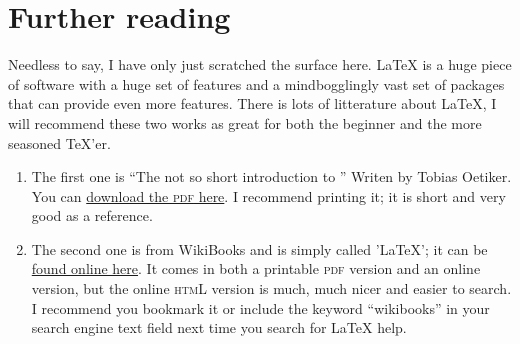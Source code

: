 \documentclass[a4paper, 11pt]{article} %
\begin{document}
\section{Further reading}
Needless to say, I have only just scratched the surface here. \LaTeX{} is a huge
piece of software with a huge set of features and a mindbogglingly vast set of
packages that can provide even more features. 
There is lots of litterature about \LaTeX{}, I will recommend these two works as
great for both the beginner and the more seasoned \TeX'er.

\begin{enumerate}
	\item The first one is ``The not so short introduction to
		\LaTeXe{}'' Writen by Tobias Oetiker. You can
		\href{http://tobi.oetiker.ch/lshort/lshort.pdf}{download the
			\textsc{pdf} here}.
		I recommend printing it; it is short and very good as a
		reference.
	\item The second one is from WikiBooks and is simply called
		'\LaTeX{}'; it can be
		\href{http://en.wikibooks.org/wiki/LaTeX/}{found online here}.
		It comes in both a printable \textsc{pdf} version and an online
		version, but the online \textsc{htmL} version is much, much 
		nicer and easier to search. I recommend you bookmark it or
		include the keyword ``wikibooks'' in your search engine text 
		field next time you search for \LaTeX{} help.
		
\end{enumerate}
\end{document}
